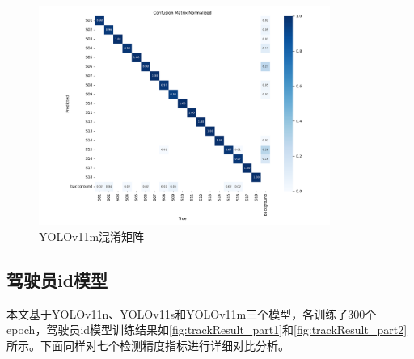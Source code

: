 \begin{figure}[H]
    \centering
    \includegraphics[width=0.85\textwidth]{figs/chap04/m_confusion_matrix_normalized.png}
    \caption{YOLOv11m混淆矩阵}
    \label{fig:mmatrix}
\end{figure}

\subsection{驾驶员id模型}
本文基于YOLOv11n、YOLOv11s和YOLOv11m三个模型，各训练了300个epoch，驾驶员id模型训练结果如\ref{fig:trackResult_part1}和\ref{fig:trackResult_part2}所示。下面同样对七个检测精度指标进行详细对比分析。

